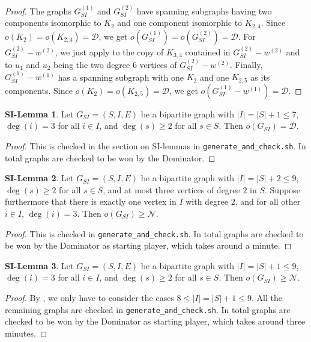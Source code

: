 \documentclass[a4paper,11pt,oneside]{scrartcl}
\theoremstyle{definition}
\newtheorem{si-lemma}{SI-Lemma}
\theoremstyle{remark}
\begin{document}
\begin{proof}
    The graphs $G_{SI}^{(1)}$ and $G_{SI}^{(2)}$ have spanning subgraphs having two components isomorphic to $K_2$ and one component isomorphic to $K_{2,4}$. Since $o(K_2) = o(K_{2,4}) = \mathcal D$, we get $o(G_{SI}^{(1)}) = o(G_{SI}^{(2)}) = \mathcal D$. For $G_{SI}^{(2)} - w^{(2)}$, we just apply  to the copy of $K_{3,4}$ contained in $G_{SI}^{(2)} - w^{(2)}$ and to $u_1$ and $u_2$ being the two degree $6$ vertices of $G_{SI}^{(2)} - w^{(2)}$. Finally, $G_{SI}^{(1)} - w^{(1)}$ has a spanning subgraph with one $K_2$ and one $K_{2,5}$ as its components. Since $o(K_2) = o(K_{2,5}) = \mathcal D$, we get $o(G_{SI}^{(1)} - w^{(1)}) = \mathcal D$.
\end{proof}

\begin{si-lemma}\label{si-lemma:S6I7}
    Let $G_{SI}=(S,I,E)$ be a bipartite graph with $|I| = |S|+1\leq 7$, $\deg(i)=3$ for all $i\in I$, and $\deg(s) \geq 2$ for all $s\in S$. Then $o(G_{SI}) = \mathcal D$. 
\end{si-lemma}
\begin{proof}
    This is checked in the section on SI-lemmas in \texttt{generate\_and\_check.sh}.
    In total  graphs are checked to be won by the Dominator.
\end{proof}

\begin{si-lemma}\label{si-lemma:S7I9}
    Let $G_{SI}=(S,I,E)$ be a bipartite graph with $|I| = |S|+2\leq 9$, $\deg(s) \geq 2$ for all $s\in S$, and at most three vertices of degree $2$ in $S$. Suppose furthermore that there is exactly one vertex in $I$ with degree $2$, and for all other $i \in I$, $\deg(i)=3$. Then $o(G_{SI})\geq \mathcal N$. 
\end{si-lemma}
\begin{proof}
    This is checked in \texttt{generate\_and\_check.sh}.
    In total  graphs are checked to be won by the Dominator as starting player, which takes around a minute.
\end{proof}

\begin{si-lemma}\label{si-lemma:S8I9}
    Let $G_{SI}=(S,I,E)$ be a bipartite graph with $|I| = |S|+ 1 \leq 9$, $\deg(i)=3$ for all $i\in I$, and $\deg(s) \geq 2$ for all $s\in S$. Then $o(G_{SI})\geq  \mathcal N$. 
\end{si-lemma}
\begin{proof}
    By , we only have to consider the cases $8 \leq |I| = |S|+1 \leq 9$. All the remaining graphs are checked in \texttt{generate\_and\_check.sh}.
    In total  graphs are checked to be won by the Dominator as starting player, which takes around three minutes.
\end{proof}
\end{document}
